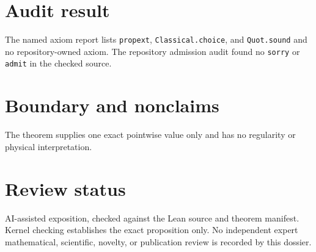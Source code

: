 \documentclass[11pt]{article}
\begin{document}
\section{Audit result}
The named axiom report lists \texttt{propext}, \texttt{Classical.choice}, and
\texttt{Quot.sound} and no repository-owned axiom.  The repository admission audit found no
\texttt{sorry} or \texttt{admit} in the checked source.

\section{Boundary and nonclaims}
The theorem supplies one exact pointwise value only and has no regularity or physical interpretation.

\section{Review status}
AI-assisted exposition, checked against the Lean source and theorem manifest.  Kernel checking
establishes the exact proposition only.  No independent expert mathematical, scientific,
novelty, or publication review is recorded by this dossier.
\end{document}

